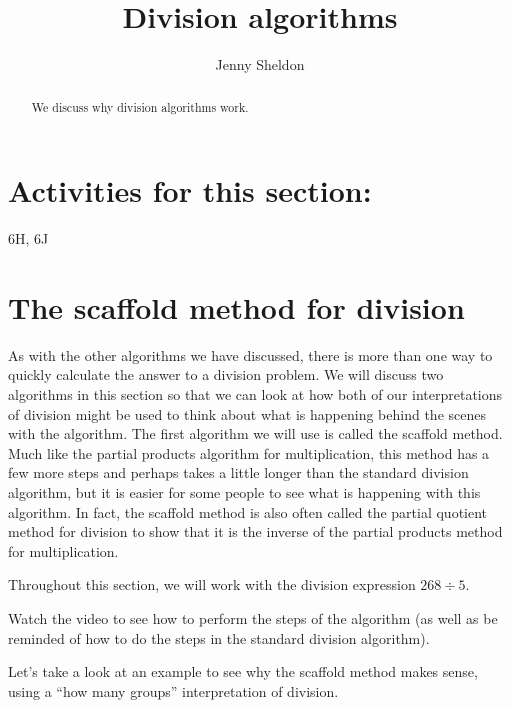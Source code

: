 \documentclass{ximera}
\title{Division algorithms}
\author{Jenny Sheldon}
\begin{document}
\begin{abstract}
We discuss why division algorithms work.
\end{abstract}
\maketitle

\section{Activities for this section:} 6H, 6J

\section{The scaffold method for division}

As with the other algorithms we have discussed, there is more than one way to quickly calculate the answer to a division problem. We will discuss two algorithms in this section so that we can look at how both of our interpretations of division might be used to think about what is happening behind the scenes with the algorithm. The first algorithm we will use is called the scaffold method. Much like the partial products algorithm for multiplication, this method has a few more steps and perhaps takes a little longer than the standard division algorithm, but it is easier for some people to see what is happening with this algorithm. In fact, the scaffold method is also often called the partial quotient method for division to show that it is the inverse of the partial products method for multiplication.

Throughout this section, we will work with the division expression $268 \div 5$.

Watch the video to see how to perform the steps of the algorithm (as well as be reminded of how to do the steps in the standard division algorithm).


Let's take a look at an example to see why the scaffold method makes sense, using a ``how many groups'' interpretation of division.
\end{document}
